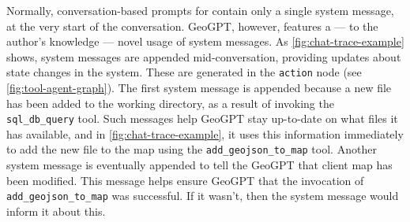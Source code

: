 Normally, conversation-based prompts for  contain only a single system message, at the very start of the conversation. GeoGPT, however, features a --- to the author's knowledge --- novel usage of system messages. As \autoref{fig:chat-trace-example} shows, system messages are appended mid-conversation, providing updates about state changes in the system. These are generated in the \texttt{action} node (see \autoref{fig:tool-agent-graph}). The first system message is appended because a new file has been added to the working directory, as a result of invoking the \texttt{sql\_db\_query} tool. Such messages help GeoGPT stay up-to-date on what files it has available, and in \autoref{fig:chat-trace-example}, it uses this information immediately to add the new file to the map using the \texttt{add\_geojson\_to\_map} tool. Another system message is eventually appended to tell the GeoGPT that client map has been modified. This message helps ensure GeoGPT that the invocation of \texttt{add\_geojson\_to\_map} was successful. If it wasn't, then the system message would inform it about this.

\glsresetall


